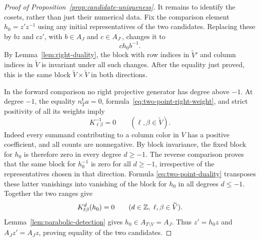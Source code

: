 \begin{proof}[Proof of Proposition~\ref{prop:candidate-uniqueness}]
It remains to identify the cosets, rather than just their numerical
data.  Fix the comparison element \(h_0=z'z^{-1}\) using any initial
representatives of the two candidates.  Replacing these by \(bz\)
and \(cz'\), with \(b\in A_J\) and \(c\in A_{J'}\), changes it to
\[
 c h_0 b^{-1}.
\]
By Lemma~\ref{lem:right-duality}, the block with row indices in
\(\widetilde V'\) and column indices in \(\widetilde V\) is
invariant under all such changes.  After the equality just proved,
this is the same block \(\widetilde V\times\widetilde V\) in both
directions.

In the forward comparison no right projective generator has degree
above \(-1\).  At degree \(-1\), the equality
\(n_T^{\mathsf t}a=0\), formula~\eqref{eq:two-point-right-weight},
and strict positivity of all its weights imply
\[
 K^{-1}_{\ell\beta}=0
       \qquad(\ell,\beta\in\widetilde V).
\]
Indeed every summand contributing to a column color in \(V\) has
a positive coefficient, and all counts are nonnegative.  By block
invariance, the fixed block for \(h_0\) is therefore zero in every
degree \(d\ge-1\).  The reverse comparison proves that the same
block for \(h_0^{-1}\) is zero for all \(d\ge-1\), irrespective of
the representatives chosen in that direction.  Formula
\eqref{eq:two-point-duality} transposes these latter vanishings into
vanishing of the block for \(h_0\) in all degrees \(d\le-1\).
Together the two ranges give
\[
 K^d_{\ell\beta}(h_0)=0
       \qquad(d\in\mathbb Z,\ \ell,\beta\in\widetilde V).
\]
Lemma~\ref{lem:parabolic-detection} gives
\(h_0\in A_{T\setminus V}=A_J\).  Thus
\(z'=h_0z\) and \(A_Jz'=A_Jz\), proving equality of the two
candidates.
\end{proof}
